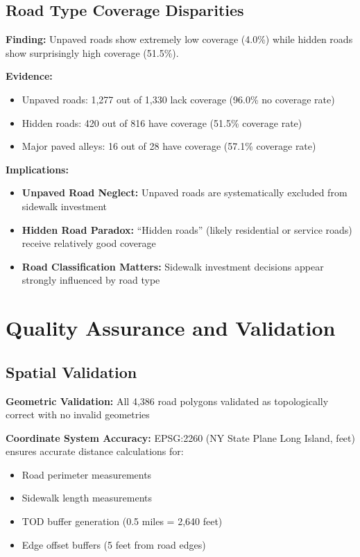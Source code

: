 \documentclass[11pt,letterpaper]{article}
\begin{document}
\subsection{Road Type Coverage Disparities}

\textbf{Finding:} Unpaved roads show extremely low coverage (4.0\%) while hidden roads show surprisingly high coverage (51.5\%).

\textbf{Evidence:}
\begin{itemize}
    \item Unpaved roads: 1,277 out of 1,330 lack coverage (96.0\% no coverage rate)
    \item Hidden roads: 420 out of 816 have coverage (51.5\% coverage rate)
    \item Major paved alleys: 16 out of 28 have coverage (57.1\% coverage rate)
\end{itemize}

\textbf{Implications:}
\begin{itemize}
    \item \textbf{Unpaved Road Neglect:} Unpaved roads are systematically excluded from sidewalk investment
    \item \textbf{Hidden Road Paradox:} ``Hidden roads'' (likely residential or service roads) receive relatively good coverage
    \item \textbf{Road Classification Matters:} Sidewalk investment decisions appear strongly influenced by road type
\end{itemize}

\section{Quality Assurance and Validation}

\subsection{Spatial Validation}

\textbf{Geometric Validation:} All 4,386 road polygons validated as topologically correct with no invalid geometries

\textbf{Coordinate System Accuracy:} EPSG:2260 (NY State Plane Long Island, feet) ensures accurate distance calculations for:
\begin{itemize}
    \item Road perimeter measurements
    \item Sidewalk length measurements
    \item TOD buffer generation (0.5 miles = 2,640 feet)
    \item Edge offset buffers (5 feet from road edges)
\end{itemize}
\end{document}
